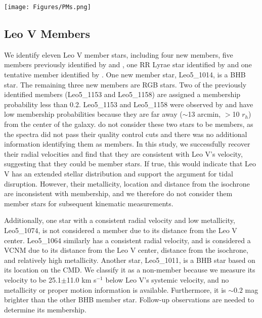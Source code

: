 \documentclass[twocolumn]{aastex63}
\begin{document}
\begin{figure*}[!htbp]
\centering
\texttt{[image: Figures/PMs.png]}
\caption{{\it Gaia} EDR3 proper motions for Bo{\"o}tes I, Leo IV and Leo V. Crosses indicate UFD proper motions from \citet{mcc2020}. See Figure~\ref{locations} for definitions of each symbol.  \label{PMs}}
\end{figure*}

\subsection{Leo V Members}
\label{sec:leov_members}
We identify eleven Leo V member stars, including four new members, five members previously identified by \citet{wal2009} and \citet{col2017}, one RR Lyrae star identified by \citet{med2017} and one tentative member identified by \citet{mut2020}. One new member star, Leo5\_1014, is a BHB star. The remaining three new members are RGB stars. Two of the previously identified members (Leo5\_1153 and Leo5\_1158) are assigned a membership probability less than 0.2. Leo5\_1153 and Leo5\_1158 were observed by \citet{wal2009} and have low membership probabilities because they are far away ($\sim$13 arcmin, $>$10 $r_h$) from the center of the galaxy.
\citet{mut2020} do not consider these two stars to be members, as the spectra did not pass their quality control cuts and there was no additional information identifying them as members. In this study, we successfully recover their radial velocities and find that they are consistent with Leo V's velocity, suggesting that they could be member stars. If true, this would indicate that Leo V has an extended stellar distribution and support the argument for tidal disruption. However, their metallicity, location and distance from the isochrone are inconsistent with membership, and we therefore do not consider them member stars for subsequent kinematic measurements. 

Additionally, one star with a consistent radial velocity and low metallicity, Leo5\_1074, is not considered a member due to its distance from the Leo V center. Leo5\_1064 similarly has a consistent radial velocity, and is considered a VCNM due to its distance from the Leo V center, distance from the isochrone, and relatively high metallicity. Another star, Leo5\_1011, is a BHB star based on its location on the CMD.  We classify it as a non-member because we measure its velocity to be 25.1$\pm$11.0 km s$^{-1}$ below Leo V's systemic velocity, and no metallicity or proper motion information is available. Furthermore, it is $\sim 0.2$ mag brighter than the other BHB member star. Follow-up observations are needed to determine its membership.
\end{document}
